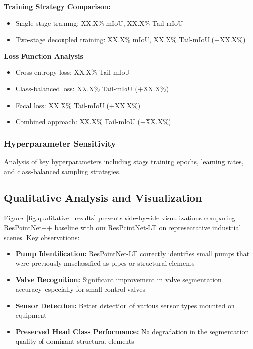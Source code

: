 \documentclass[preprint,12pt]{elsarticle}
\begin{document}
\textbf{Training Strategy Comparison:}
\begin{itemize}
    \item Single-stage training: XX.X\% mIoU, XX.X\% Tail-mIoU
    \item Two-stage decoupled training: XX.X\% mIoU, XX.X\% Tail-mIoU (+XX.X\%)
\end{itemize}

\textbf{Loss Function Analysis:}
\begin{itemize}
    \item Cross-entropy loss: XX.X\% Tail-mIoU
    \item Class-balanced loss: XX.X\% Tail-mIoU (+XX.X\%)
    \item Focal loss: XX.X\% Tail-mIoU (+XX.X\%)
    \item Combined approach: XX.X\% Tail-mIoU (+XX.X\%)
\end{itemize}

\subsubsection{Hyperparameter Sensitivity}
Analysis of key hyperparameters including stage training epochs, learning rates, and class-balanced sampling strategies.

\subsection{Qualitative Analysis and Visualization}
\label{sec:qualitative_analysis}

Figure~\ref{fig:qualitative_results} presents side-by-side visualizations comparing ResPointNet++ baseline with our ResPointNet-LT on representative industrial scenes. Key observations:

\begin{itemize}
    \item \textbf{Pump Identification:} ResPointNet-LT correctly identifies small pumps that were previously misclassified as pipes or structural elements
    \item \textbf{Valve Recognition:} Significant improvement in valve segmentation accuracy, especially for small control valves
    \item \textbf{Sensor Detection:} Better detection of various sensor types mounted on equipment
    \item \textbf{Preserved Head Class Performance:} No degradation in the segmentation quality of dominant structural elements
\end{itemize}
\end{document}
